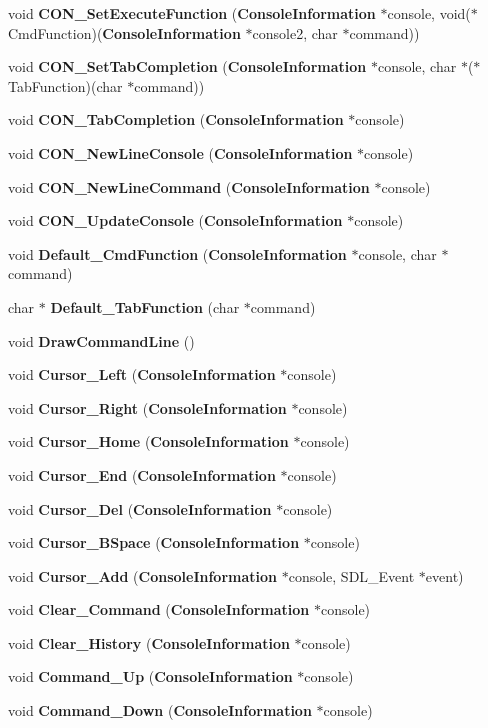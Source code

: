 \begin{CompactItemize}
void {\bf CON\_\-Set\-Execute\-Function} ({\bf Console\-Information} $\ast$console, void($\ast$Cmd\-Function)({\bf Console\-Information} $\ast$console2, char $\ast$command))
\item 
void {\bf CON\_\-Set\-Tab\-Completion} ({\bf Console\-Information} $\ast$console, char $\ast$($\ast$Tab\-Function)(char $\ast$command))
\item 
void {\bf CON\_\-Tab\-Completion} ({\bf Console\-Information} $\ast$console)
\item 
void {\bf CON\_\-New\-Line\-Console} ({\bf Console\-Information} $\ast$console)
\item 
void {\bf CON\_\-New\-Line\-Command} ({\bf Console\-Information} $\ast$console)
\item 
void {\bf CON\_\-Update\-Console} ({\bf Console\-Information} $\ast$console)
\item 
void {\bf Default\_\-Cmd\-Function} ({\bf Console\-Information} $\ast$console, char $\ast$command)
\item 
char $\ast$ {\bf Default\_\-Tab\-Function} (char $\ast$command)
\item 
void {\bf Draw\-Command\-Line} ()
\item 
void {\bf Cursor\_\-Left} ({\bf Console\-Information} $\ast$console)
\item 
void {\bf Cursor\_\-Right} ({\bf Console\-Information} $\ast$console)
\item 
void {\bf Cursor\_\-Home} ({\bf Console\-Information} $\ast$console)
\item 
void {\bf Cursor\_\-End} ({\bf Console\-Information} $\ast$console)
\item 
void {\bf Cursor\_\-Del} ({\bf Console\-Information} $\ast$console)
\item 
void {\bf Cursor\_\-BSpace} ({\bf Console\-Information} $\ast$console)
\item 
void {\bf Cursor\_\-Add} ({\bf Console\-Information} $\ast$console, SDL\_\-Event $\ast$event)
\item 
void {\bf Clear\_\-Command} ({\bf Console\-Information} $\ast$console)
\item 
void {\bf Clear\_\-History} ({\bf Console\-Information} $\ast$console)
\item 
void {\bf Command\_\-Up} ({\bf Console\-Information} $\ast$console)
\item 
void {\bf Command\_\-Down} ({\bf Console\-Information} $\ast$console)
\end{CompactItemize}


